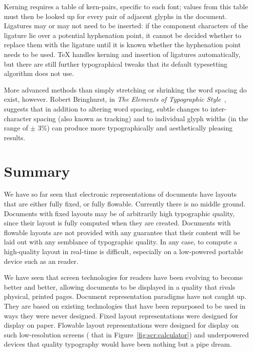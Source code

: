 Kerning requires a table of kern-pairs, specific to each font; values from this table must then be looked up for every pair of adjacent glyphs in the document. Ligatures may or may not need to be inserted: if the component characters of the ligature lie over a potential hyphenation point, it cannot be decided whether to replace them with the ligature until it is known whether the hyphenation point needs to be used. \TeX{} handles kerning and insertion of ligatures automatically, but there are still further typographical tweaks that its default typesetting algorithm does not use.

More advanced methods than simply stretching or shrinking the word spacing do exist, however. Robert Bringhurst, in \emph{The Elements of Typographic Style}~\cite{Bringhurst2008}, suggests that in addition to altering word spacing, subtle changes to inter-character spacing (also known as \gls{tracking}) and to individual glyph widths (in the range of $\pm$ 3\%) can produce more typographically and aesthetically pleasing results.



\section{Summary}

We have so far seen that electronic representations of documents have layouts that are either fully fixed, or fully flowable. Currently there is no middle ground. Documents with fixed layouts may be of arbitrarily high typographic quality, since their layout is fully computed when they are created. Documents with flowable layouts are not provided with any guarantee that their content will be laid out with any semblance of typographic quality. In any case, to compute a high-quality layout in real-time is difficult, especially on a low-powered portable device such as an \ebook{} reader.

We have seen that screen technologies for \ebook{} readers have been evolving to become better and better, allowing documents to be displayed in a quality that rivals physical, printed pages. Document representation paradigms have not caught up. They are based on existing technologies that have been repurposed to be used in ways they were never designed. Fixed layout representations were designed for display on paper. Flowable layout representations were designed for display on such low-resolution screens (\eg{} that in Figure~\ref{fig:scr:calculator}) and underpowered devices that quality typography would have been nothing but a pipe dream.


